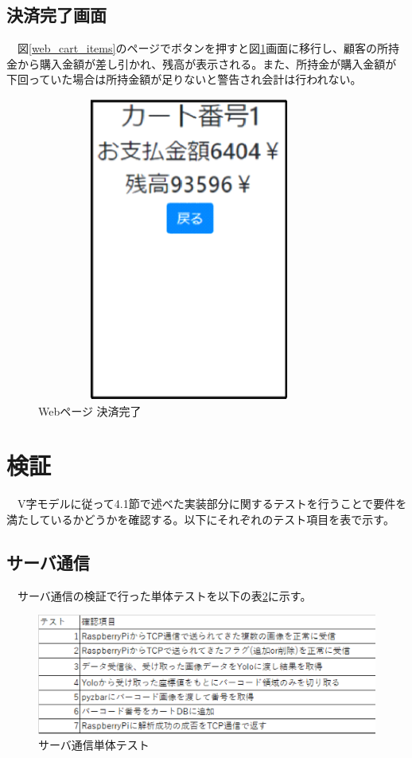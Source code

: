 \subsection*{決済完了画面}
　図\ref{web_cart_items}のページでボタンを押すと図\ref{web_checksum}画面に移行し、顧客の所持金から購入金額が差し引かれ、残高が表示される。また、所持金が購入金額が下回っていた場合は所持金額が足りないと警告され会計は行われない。
\begin{figure}[htbp]
\centering
\includegraphics[width=10cm,height=10cm]{./pic/web/3.eps}
\caption{Webページ 決済完了}
\label{web_checksum}
\end{figure}


\newpage

\section{検証}
　V字モデルに従って4.1節で述べた実装部分に関するテストを行うことで要件を満たしているかどうかを確認する。以下にそれぞれのテスト項目を表で示す。

\subsection*{サーバ通信}
　サーバ通信の検証で行った単体テストを以下の表\ref{server_test}に示す。
\begin{figure}[htbp]
\centering
\includegraphics[width=12cm]{./pic/server_test.eps}
\caption{サーバ通信単体テスト}
\label{server_test}
\end{figure}


